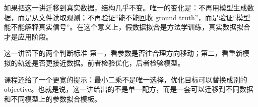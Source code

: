 \documentclass[a4paper]{article}
\begin{document}
如果把这一讲迁移到真实数据，结构几乎不变。唯一的变化是：不再用模型生成数据，而是从文件读取观测；不再验证“能不能回收 ground truth”，而是验证“模型能不能解释真实信号”。在这个意义上，假数据拟合是方法学训练，真实数据拟合才是应用阶段。

\begin{importantbox}{这一讲留下的两个判断标准}
第一，看参数是否往合理方向移动；第二，看重新模拟的轨迹是否更接近数据。前者检验优化，后者检验模型。
\end{importantbox}

课程还给了一个更宽的提示：最小二乘不是唯一选择，优化目标可以替换成别的 objective。也就是说，这一讲给出的不是单一配方，而是一套可以迁移到不同数据和不同模型上的参数拟合模板。
\end{document}
